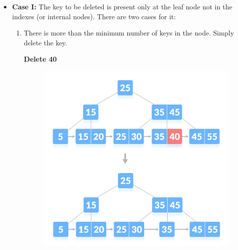 \documentclass{article}
\begin{document}
    \begin{itemize}
        \item \textbf{Case I:} The key to be deleted is present only at the leaf node not in the indexes (or internal nodes). There are two cases for it:
        \begin{enumerate}
            \item There is more than the minimum number of keys in the node. Simply delete the key.
            \begin{center}
                 \color{red}\textbf{Delete 40}
            \end{center}
            \begin{figure}
                \centering \includegraphics[scale = 0.3]{Images/deletion-1.png}
            \end{figure}
                   

\end{enumerate}
\end{itemize}
\end{document}
